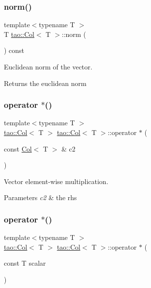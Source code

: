 \subsubsection{\texorpdfstring{norm()}{norm()}}
{\footnotesize\ttfamily template$<$typename T $>$ \\
T \mbox{\hyperlink{classtao_1_1_col}{tao\+::\+Col}}$<$ T $>$\+::norm (\begin{DoxyParamCaption}{ }\end{DoxyParamCaption}) const}



Euclidean norm of the vector. 

\begin{DoxyReturn}{Returns}
the euclidean norm 
\end{DoxyReturn}
\mbox{\label{classtao_1_1_col_a661dd9512fad58cfbedfdf52ca6806fb}} 
\subsubsection{\texorpdfstring{operator $\ast$()}{operator *()}\hspace{0.1cm}{\footnotesize\ttfamily [1/2]}}
{\footnotesize\ttfamily template$<$typename T $>$ \\
\mbox{\hyperlink{classtao_1_1_col}{tao\+::\+Col}}$<$ T $>$ \mbox{\hyperlink{classtao_1_1_col}{tao\+::\+Col}}$<$ T $>$\+::operator $\ast$ (\begin{DoxyParamCaption}\item[{const \mbox{\hyperlink{classtao_1_1_col}{Col}}$<$ T $>$ \&}]{c2 }\end{DoxyParamCaption})}



Vector element-\/wise multiplication. 


\begin{DoxyParams}{Parameters}
{\em c2} & the rhs \\
\hline
\end{DoxyParams}
\mbox{\label{classtao_1_1_col_a734ed22497ede69a2ed0f791bd503355}} 
\subsubsection{\texorpdfstring{operator $\ast$()}{operator *()}\hspace{0.1cm}{\footnotesize\ttfamily [2/2]}}
{\footnotesize\ttfamily template$<$typename T $>$ \\
\mbox{\hyperlink{classtao_1_1_col}{tao\+::\+Col}}$<$ T $>$ \mbox{\hyperlink{classtao_1_1_col}{tao\+::\+Col}}$<$ T $>$\+::operator $\ast$ (\begin{DoxyParamCaption}\item[{const T}]{scalar }\end{DoxyParamCaption})}



